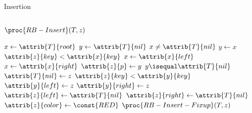 \documentclass[aspectratio=1610]{beamer}
\begin{document}
\begin{frame}{Insertion}{}
\begin{columns}[t]
\begin{block}{$\proc{RB-Insert}(T,z)$}
            \vspace{-\abovedisplayskip}
            \begin{codebox}
                \li $x \gets \attrib{T}{root}$ 
                \li $y \gets \attrib{T}{nil}$ 
                \li \While $x \neq \attrib{T}{nil}$ 
                    \Do
                \li     $y \gets x$ 
                \li     \If $\attrib{z}{key} < \attrib{x}{key}$ 
                        \Then
                \li         $x \gets \attrib{x}{left}$
                \li     \Else $x \gets \attrib{x}{right}$ 
                        \End
                    \End
                \li $\attrib{z}{p} \gets y$ 
                \li \If $y \isequal \attrib{T}{nil}$
                    \Then
                \li     $\attrib{T}{nil} \gets z$ 
                \li \ElseIf $\attrib{z}{key} < \attrib{y}{key}$ 
                    \Then
                \li     $\attrib{y}{left} \gets z$
                \li \Else $\attrib{y}{right} \gets z$
                    \End
                \li $\attrib{z}{left}\gets \attrib{T}{nil}$
                \li $\attrib{z}{right} \gets \attrib{T}{nil}$ 
                \li $\attrib{z}{color} \gets \const{RED}$
                \li $\proc{RB-Insert-Fixup}(T,z)$
            \end{codebox}
        \end{block}
    \end{columns}
\end{frame}
\end{document}
